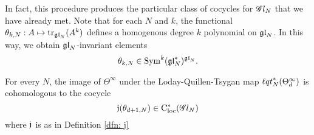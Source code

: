 In fact, this procedure produces the particular class of cocycles for $\mathscr G l_{N}$ that we have already met. 
Note that for each $N$ and $k$, the functional $\theta_{k,N} : A \mapsto {\rm tr}_{{\mathfrak{gl}}_N} (A^k)$ defines a homogenous degree $k$ polynomial on ${\mathfrak{gl}}_N$. 
In this way, we obtain ${\mathfrak{gl}}_N$-invariant elements
\[
\theta_{k,N} \in {\rm Sym}^{k}({\mathfrak{gl}}_N^*)^{{\mathfrak{gl}}_N} .
\]

\begin{lem}
For every $N$, the image of $\Theta^\infty$ under the Loday-Quillen-Tsygan map ${\ell q t}_N^*(\Theta_d^\infty)$ is cohomologous to the cocycle
\[
\mathfrak j(\theta_{d+1, N}) \in {\rm C}_{\rm loc}^*(\mathscr G l_N)
\]
where $\mathfrak j$ is as in Definition \ref{dfn: j}
\end{lem}


